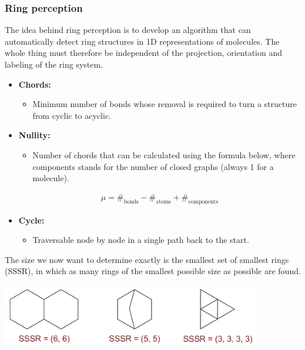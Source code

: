 \subsubsection{Ring perception}

The idea behind ring perception is to develop an algorithm that can automatically detect ring structures in 1D representations of molecules. The whole thing must therefore be independent of the projection, orientation and labeling of the ring system.

\begin{itemize}
    \item \textbf{Chords:}
    \begin{itemize}
        \item Minimum number of bonds whose removal is required to turn a structure from cyclic to acyclic.
    \end{itemize}
    \item \textbf{Nullity:}
    \begin{itemize}
        \item Number of chords that can be calculated using the formula below, where components stands for the number of closed graphs (always 1 for a molecule).
    \end{itemize}
    \begin{align}
        \mu=\#_\mathrm{bonds}-\#_\mathrm{atoms}+\#_\mathrm{components}
    \end{align}
    \item \textbf{Cycle:}
    \begin{itemize}
        \item Traversable node by node in a single path back to the start.
    \end{itemize}
\end{itemize}

The size we now want to determine exactly is the smallest set of smallest rings (SSSR), in which as many rings of the smallest possible size as possible are found. 

\begin{center}
    \includegraphics[width=0.85\textwidth]{img/cheminformatics/RingPerceptionSssr.png}
\end{center}


